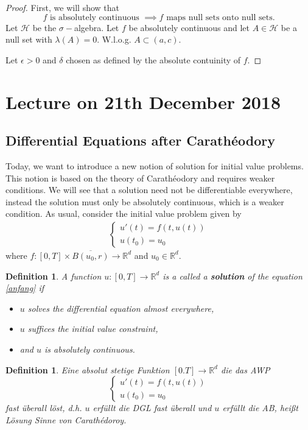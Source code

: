 \documentclass[a4paper, 11pt]{article}
\newtheorem{definition}[theorem]{Definition}
\newtheorem*{definition*}{Definition}
\begin{document}
\begin{proof}
	First, we will show that 
	\[
		f \text{ is absolutely continuous } \implies f \text{ maps null sets onto null sets.}
	\]
	Let $\mathcal H$ be the $\sigma-$algebra. Let $f$ be absolutely continuous and let $A \in \mathcal H$ be a null set with $\lambda(A) = 0$. W.l.o.g. $A \subset (a,c)$.
	
	Let $\epsilon > 0$ and $\delta$ chosen as defined by the absolute contuinity of $f$.
\end{proof}

\section{Lecture on 21th December 2018}

\subsection*{Differential Equations after Carathéodory}
Today, we want to introduce a new notion of solution for initial value problems. This notion is based on the theory of Carathéodory and requires weaker conditions. We will see that a solution need not be differentiable everywhere, instead the solution must only be absolutely continuous, which is a weaker condition. As usual, consider the initial value problem given by
\begin{align}\label{anfang}
	\begin{cases}
		u'(t) = f(t,u(t)) \\ u(t_0) = u_0
	\end{cases} 
\end{align}
where $f: [0,T] \times \overline{B(u_0, r)} \to \mathbb R^d$ and $u_0 \in \mathbb R^d$. 

\begin{definition*}
	A function $u: [0,T] \to \mathbb R^d$ is a called a \textbf{solution} of the equation \eqref{anfang} if 
	\begin{itemize}
		\item $u$ solves the differential equation almost everywhere,
		\item $u$ suffices the initial value constraint,
		\item and $u$ is absolutely continuous.
	\end{itemize}
\end{definition*}

\begin{definition}
	Eine absolut stetige Funktion $[0.T] \to \mathbb R^d$ die das AWP \[
	\begin{cases}
	u'(t) = f(t,u(t)) \\u(t_0) = u_0
	\end{cases}
	\]
	fast überall löst, d.h. $u$ erfüllt die DGL fast überall und $u$ erfüllt die AB, heißt Lösung Sinne von Carathédoroy.
\end{definition}
\end{document}
